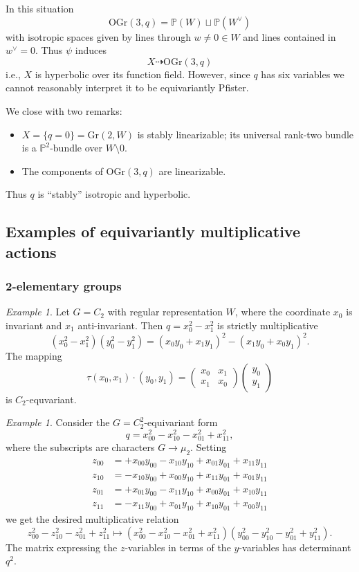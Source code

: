 \documentclass[12pt]{amsart}
\numberwithin{equation}{section}
\newcommand{\ra}{\rightarrow}
\newcommand{\bP}{\mathbb{P}}
\newcommand{\Gr}{\mathrm{Gr}}
\newcommand{\OGr}{\mathrm{OGr}}
\theoremstyle{plain}
\theoremstyle{definition}
\theoremstyle{remark}
\newtheorem{exam}[prop]{Example}
\begin{document}
In this situation
$$\OGr(3,q) = \bP(W) \sqcup \bP(W^{\vee})$$
with isotropic spaces given by lines through $w\neq 0 \in W$ and
lines contained in $w^{\vee}=0$.  Thus $\psi$ induces
$$X \dashrightarrow \OGr(3,q)$$
i.e., $X$ is hyperbolic over its function field.  
However, since $q$ has six variables we cannot 
reasonably interpret it to be equivariantly Pfister.  

We close with two remarks:
\begin{itemize}
\item{$X=\{q=0\}=\Gr(2,W)$ is stably linearizable; its universal
rank-two bundle is a $\bP^2$-bundle over $W\setminus 0$.}
\item{The components of $\OGr(3,q)$ are linearizable.}
\end{itemize}
Thus $q$ is ``stably'' isotropic and hyperbolic.  
 

\subsection*{Examples of equivariantly multiplicative actions}
\subsubsection*{2-elementary groups}
\begin{exam}
Let $G=C_2$ with regular representation $W$, where the coordinate $x_0$ is 
invariant and $x_1$ anti-invariant. Then  $q=x_0^2 - x_1^2$
is strictly multiplicative
$$(x_0^2-x_1^2)(y_0^2-y_1^2) = (x_0y_0+x_1y_1)^2 - (x_1y_0+x_0y_1)^2.$$
The mapping
$$\tau(x_0,x_1)\cdot (y_0,y_1) = \left( \begin{matrix} x_0 & x_1 \\ x_1 & x_0 \end{matrix} \right) 
\left( \begin{matrix} y_0 \\ y_1 \end{matrix}\right)$$
is $C_2$-equvariant.
\end{exam}


\begin{exam}
Consider the $G=C_2^2$-equivariant form
$$q=x_{00}^2 - x_{10}^2 - x_{01}^2 +x_{11}^2,
$$
where the subscripts are characters $G \ra \mu_2$.
Setting
\begin{align*}
z_{00} &= +x_{00}y_{00}-x_{10}y_{10}+x_{01}y_{01}+x_{11}y_{11}\\
z_{10} &= -x_{10}y_{00}+x_{00}y_{10} +x_{11}y_{01}+x_{01}y_{11}\\
z_{01} &= +x_{01}y_{00} -x_{11}y_{10} + x_{00}y_{01} + x_{10}y_{11} \\
z_{11} &= -x_{11}y_{00} + x_{01}y_{10} + x_{10}y_{01} + x_{00} y_{11}
\end{align*}
we get the desired multiplicative relation
$$z^2_{00}-z_{10}^2 - z_{01}^2 + z_{11}^2 \mapsto
(x^2_{00}-x_{10}^2 - x_{01}^2 + x_{11}^2)(y^2_{00}-y_{10}^2 - y_{01}^2 + y_{11}^2).
$$
The matrix expressing the $z$-variables in terms of the $y$-variables
has determinant $q^2$.
\end{exam}
\end{document}
